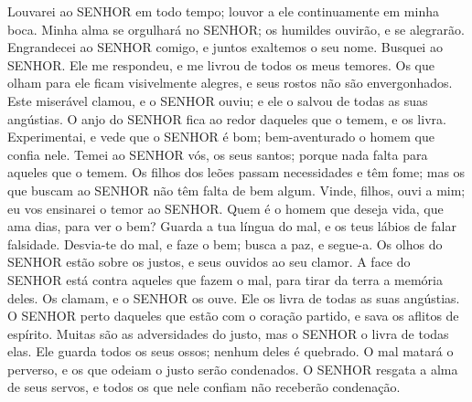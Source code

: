 {\PP 
  Louvarei ao SENHOR em todo tempo;
{} louvor a ele continuamente em minha boca.
  Minha alma se orgulhará no SENHOR; os humildes ouvirão, e se alegrarão.
  Engrandecei ao SENHOR comigo, e juntos exaltemos o seu nome.
  Busquei ao SENHOR. Ele me respondeu, e me livrou de todos os meus temores.
  Os que olham para ele ficam visivelmente alegres, e seus rostos não são envergonhados.
  Este miserável clamou, e o SENHOR ouviu; e ele o salvou de todas as suas angústias.
  O anjo do SENHOR fica ao redor daqueles que o temem, e os livra.
  Experimentai, e vede que o SENHOR é bom; bem-aventurado
{} o homem que confia nele.
  Temei ao SENHOR vós, os seus santos; porque nada falta para aqueles que o temem.
  Os filhos dos leões passam necessidades e têm fome; mas os que buscam ao SENHOR não têm falta de bem algum.
  Vinde, filhos, ouvi a mim; eu vos ensinarei o temor ao SENHOR.
  Quem é o homem que deseja vida, que ama
{} dias, para ver o bem?
  Guarda a tua língua do mal, e os teus lábios de falar falsidade.
  Desvia-te do mal, e faze o bem; busca a paz, e segue-a.
  Os olhos do SENHOR estão sobre os justos, e seus ouvidos
{} ao seu clamor.
  A face do SENHOR está contra aqueles que fazem o mal, para tirar da terra a memória deles.
  Os
{} clamam, e o SENHOR os ouve. Ele os livra de todas as suas angústias.
  O SENHOR
{} perto daqueles que estão com o coração partido, e sava os aflitos de espírito.
  Muitas são as adversidades do justo, mas o SENHOR o livra de todas elas.
  Ele guarda todos os seus ossos; nenhum deles é quebrado.
  O mal matará o perverso, e os que odeiam o justo serão condenados.
  O SENHOR resgata a alma de seus servos, e todos os que nele confiam não receberão condenação.
\par }


